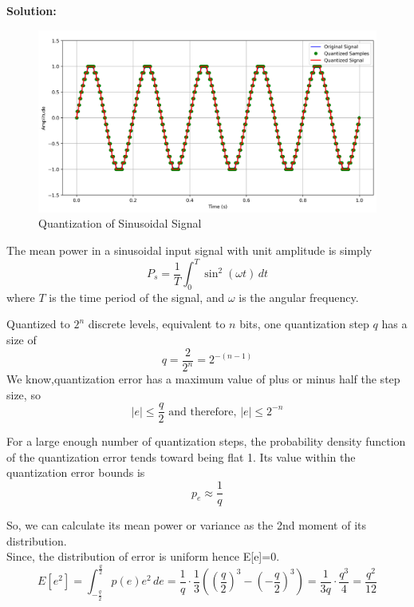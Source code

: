 \documentclass[journal,12pt,onecolumn]{IEEEtran}
\begin{document}
\textbf{Solution:}
\begin{figure}[H]
  \centering
  \includegraphics[width=1\textwidth]{Graph/a.png}
  \caption{Quantization of Sinusoidal Signal}
  \label{fig:Gate.31.2023}
\end{figure}
The mean power in a sinusoidal input signal with unit amplitude is simply
\begin{equation}
P_s = \frac{1}{T} \int_{0}^{T} \sin^2(\omega t) \, dt
\end{equation}
 where \(T\) is the time period of the signal, and \(\omega\) is the angular frequency.


Quantized to $2^n$ discrete levels, equivalent to $n$ bits, one quantization step $q$ has a size of
\begin{equation}
q = \frac{2}{2^{n}} = 2^{-(n-1)}
\end{equation}
We know,quantization error has a maximum value of plus or minus half the
step size, so 
\begin{equation}
\left| e \right| \leq \frac{q}{2} \text{ and therefore, } \left| e \right| \leq 2^{-n}
\end{equation}

For a large enough number of quantization steps, the probability density function of the quantization error tends toward being flat 1. Its value within the quantization error bounds is
\begin{equation}
p_e \approx \frac{1}{q}
\end{equation}

So, we can calculate its mean power or variance as the 2nd moment of its distribution.\\
Since, the distribution of error is uniform hence E[e]=0.
\begin{equation}
E[e^{2}] = \int_{-\frac{q}{2}}^{\frac{q}{2}} p(e) e^{2} \, de 
= \frac{1}{q} \cdot \frac{1}{3} \left(\left(\frac{q}{2}\right)^{3} - \left(-\frac{q}{2}\right)^{3}\right)
=\frac{1}{3q} \cdot \frac{q^{3}}{4}
=\frac{q^{2}}{12}
\end{equation}
\end{document}
